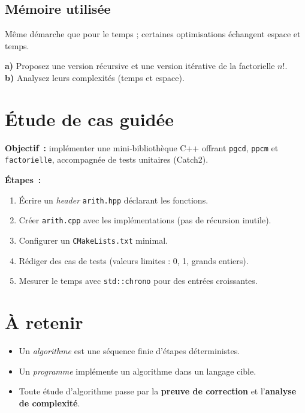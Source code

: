 \subsection{Mémoire utilisée}
Même démarche que pour le temps ; certaines optimisations échangent espace et
temps.

\begin{exercice}[]
\textbf{a)} Proposez une version récursive et une version itérative de la
factorielle \(n!\).\\
\textbf{b)} Analysez leurs complexités (temps et espace).
\end{exercice}

\section{Étude de cas guidée}

\begin{tp}
\textbf{Objectif :} implémenter une mini‑bibliothèque C++ offrant
\lstinline|pgcd|, \lstinline|ppcm| et \lstinline|factorielle|, accompagnée de
tests unitaires (Catch2).

\textbf{Étapes :}
\begin{enumerate}
  \item Écrire un \emph{header} \lstinline|arith.hpp| déclarant les fonctions.
  \item Créer \lstinline|arith.cpp| avec les implémentations (pas de récursion
        inutile).
  \item Configurer un \lstinline|CMakeLists.txt| minimal.
  \item Rédiger des cas de tests (valeurs limites : 0, 1, grands entiers).
  \item Mesurer le temps avec \lstinline|std::chrono| pour des entrées croissantes.
\end{enumerate}
\end{tp}

\section*{À retenir}
\begin{itemize}
  \item Un \emph{algorithme} est une séquence finie d'étapes déterministes.
  \item Un \emph{programme} implémente un algorithme dans un langage cible.
  \item Toute étude d'algorithme passe par la \textbf{preuve de correction} et
        l'\textbf{analyse de complexité}.
\end{itemize}

